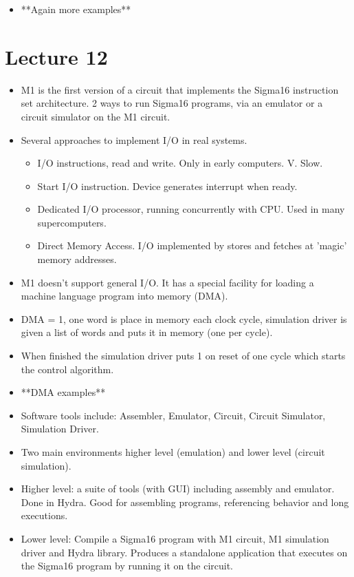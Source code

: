 \documentclass{article}
\begin{document}
\begin{itemize}
\item **Again more examples**
\end{itemize}

\section*{Lecture 12}
\begin{itemize}
\item M1 is the first version of a circuit that implements the Sigma16 instruction set architecture. 2 ways to run Sigma16 programs, via an emulator or a circuit simulator on the M1 circuit.
\item Several approaches to implement I/O in real systems. 
\begin{itemize}
\item I/O instructions, read and write. Only in early computers. V. Slow.
\item Start I/O instruction. Device generates interrupt when ready.
\item Dedicated I/O processor, running concurrently with CPU. Used in many supercomputers.
\item Direct Memory Access. I/O implemented by stores and fetches at 'magic' memory addresses.
\end{itemize}
\item M1 doesn't support general I/O. It has a special facility for loading a machine language program into memory (DMA).
\item DMA = 1, one word is place in memory each clock cycle, simulation driver is given a list of words and puts it in memory (one per cycle).
\item When finished the simulation driver puts 1 on reset of one cycle which starts the control algorithm.
\item **DMA examples**
\item Software tools include: Assembler, Emulator, Circuit, Circuit Simulator, Simulation Driver.
\item Two main environments higher level (emulation) and lower level (circuit simulation).
\item Higher level: a suite of tools (with GUI) including assembly and emulator. Done in Hydra. Good for assembling programs, referencing behavior and long executions.
\item Lower level: Compile a Sigma16 program with M1 circuit, M1 simulation driver and Hydra library. Produces a standalone application that executes on the Sigma16 program by running it on the circuit.

\end{itemize}
\end{document}
